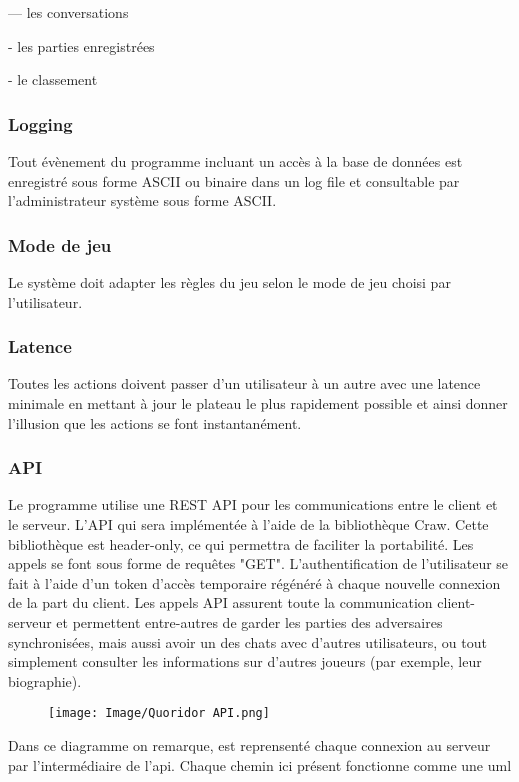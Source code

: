 \documentclass[french, utf8]{article}
\begin{document}
\item--- les conversations
\item- les parties enregistrées
\item- le classement

\subsubsection{Logging}
\label{sec:Logging}
Tout évènement du programme incluant un accès à la base de données est enregistré sous forme ASCII ou binaire dans un log file et consultable par l'administrateur système sous forme ASCII.

\subsubsection{Mode de jeu}
Le système doit adapter les règles du jeu selon le mode de jeu choisi par l'utilisateur.

\subsubsection{Latence}
Toutes les actions doivent passer d’un utilisateur à un autre avec une latence minimale en mettant à jour le plateau le plus rapidement possible et ainsi donner l'illusion que les actions se font instantanément.

\subsubsection{API}
Le programme utilise une REST API pour les communications entre le client et le serveur. L'API qui sera implémentée à l'aide de la bibliothèque Craw. Cette bibliothèque est header-only, ce qui permettra de faciliter la portabilité.
Les appels se font sous forme de requêtes "GET".
L'authentification de l'utilisateur se fait à l'aide d'un token d'accès temporaire régénéré à chaque nouvelle connexion de la part du client.
Les appels API assurent toute la communication client-serveur et permettent entre-autres de garder les parties des adversaires synchronisées, mais aussi avoir un des chats avec d'autres utilisateurs, ou tout simplement consulter les informations sur d'autres joueurs (par exemple, leur biographie).

\begin{figure}[ht]
\centering
    \texttt{[image: Image/Quoridor API.png]}
\end{figure}
Dans ce diagramme on remarque, est reprensenté chaque connexion au serveur par l'intermédiaire de l'api. Chaque chemin ici présent fonctionne comme une uml
\end{document}
